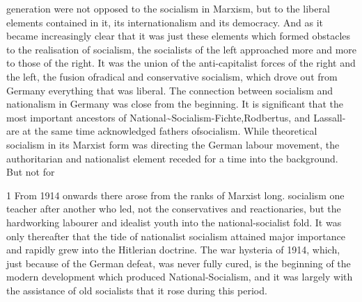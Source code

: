 \documentclass[11pt,openany]{book}
\begin{document}
generation were not opposed to the socialism in Marxism, but to the liberal elements contained in it, its internationalism and its democracy. And as it became increasingly clear that it was just these elements which formed obstacles to the realisation of socialism, the socialists of the left approached more and more to those of the right. It was the union of the anti-capitalist forces of the right and the left, the fusion ofradical and conservative socialism, which drove out from Germany everything that was liberal. The connection between socialism and nationalism in Germany was close from the beginning. It is significant that the most important ancestors of National\textasciitilde{}Socialism-Fichte,Rodbertus, and Lassall-are at the same time acknowledged fathers ofsocialism. While theoretical socialism in its Marxist form was directing the German labour movement, the authoritarian and nationalist element receded for a time into the background. But not for

1 From 1914 onwards there arose from the ranks of Marxist long. socialism one teacher after another who led, not the conservatives and reactionaries, but the hardworking labourer and idealist youth into the national-socialist fold. It was only thereafter that the tide of nationalist socialism attained major importance and rapidly grew into the Hitlerian doctrine. The war hysteria of 1914, which, just because of the German defeat, was never fully cured, is the beginning of the modern development which produced National-Socialism, and it was largely with the assistance of old socialists that it rose during this period.

\begin{center}\textasteriskcentered\hspace{0.9em}\textasteriskcentered\hspace{0.9em}\textasteriskcentered\end{center}

\begin{center}\textasteriskcentered\hspace{0.9em}\textasteriskcentered\hspace{0.9em}\textasteriskcentered\end{center}

\begin{center}\textasteriskcentered\hspace{0.9em}\textasteriskcentered\hspace{0.9em}\textasteriskcentered\end{center}
\end{document}

